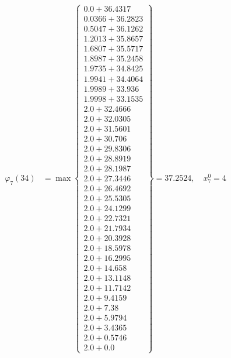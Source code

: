 \documentclass{article}
\begin{document}
\begin{align*}
  
\varphi_{7}(34) &= \max \left\{ \begin{array}{c}
0.0 + 36.4317 \\
 0.0366 + 36.2823 \\
 0.5047 + 36.1262 \\
 1.2013 + 35.8657 \\
 1.6807 + 35.5717 \\
 1.8987 + 35.2458 \\
 1.9735 + 34.8425 \\
 1.9941 + 34.4064 \\
 1.9989 + 33.936 \\
 1.9998 + 33.1535 \\
 2.0 + 32.4666 \\
 2.0 + 32.0305 \\
 2.0 + 31.5601 \\
 2.0 + 30.706 \\
 2.0 + 29.8306 \\
 2.0 + 28.8919 \\
 2.0 + 28.1987 \\
 2.0 + 27.3446 \\
 2.0 + 26.4692 \\
 2.0 + 25.5305 \\
 2.0 + 24.1299 \\
 2.0 + 22.7321 \\
 2.0 + 21.7934 \\
 2.0 + 20.3928 \\
 2.0 + 18.5978 \\
 2.0 + 16.2995 \\
 2.0 + 14.658 \\
 2.0 + 13.1148 \\
 2.0 + 11.7142 \\
 2.0 + 9.4159 \\
 2.0 + 7.38 \\
 2.0 + 5.9794 \\
 2.0 + 3.4365 \\
 2.0 + 0.5746 \\
 2.0 + 0.0
\end{array} \right\}=37.2524,\quad x_{7}^0=4\\
  
  
  

\end{align*}
\end{document}
